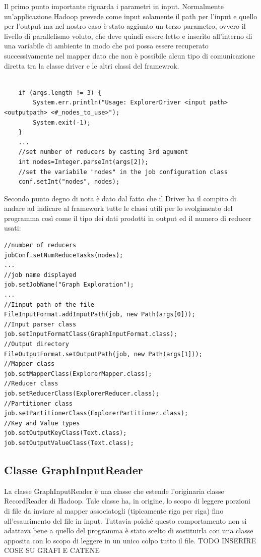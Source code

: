 \documentclass[]{IEEEtran}
\begin{document}
Il primo punto importante riguarda i parametri in input. Normalmente un'applicazione Hadoop prevede come input solamente il path per l'input e quello per l'output ma nel nostro caso è stato aggiunto un terzo parametro, ovvero il livello di parallelismo voluto, che deve quindi essere letto e inserito all'interno di una variabile di ambiente in modo che poi possa essere recuperato successivamente nel mapper dato che non è possibile alcun tipo di comunicazione diretta tra la classe driver e le altri classi del framewrok.
\begin{lstlisting}[style=javaStyle]

	if (args.length != 3) {
		System.err.println("Usage: ExplorerDriver <input path> <outputpath> <#_nodes_to_use>");
		System.exit(-1);
	}
	...
	//set number of reducers by casting 3rd agument
	int nodes=Integer.parseInt(args[2]);
	//set the variabile "nodes" in the job configuration class
	conf.setInt("nodes", nodes);
\end{lstlisting}

Secondo punto degno di nota è dato dal fatto che il Driver ha il compito di andare ad indicare al framework tutte le classi utili per lo svolgimento del programma così come il tipo dei dati prodotti in output ed il numero di reducer usati:
\begin{lstlisting}[style=javaStyle]
//number of reducers
jobConf.setNumReduceTasks(nodes); 
...
//job name displayed
job.setJobName("Graph Exploration"); 
...
//Iinput path of the file
FileInputFormat.addInputPath(job, new Path(args[0])); 
//Input parser class
job.setInputFormatClass(GraphInputFormat.class); 
//Output directory
FileOutputFormat.setOutputPath(job, new Path(args[1]));
//Mapper class
job.setMapperClass(ExplorerMapper.class);	
//Reducer class
job.setReducerClass(ExplorerReducer.class); 
//Partitioner class
job.setPartitionerClass(ExplorerPartitioner.class); 
//Key and Value types
job.setOutputKeyClass(Text.class); 
job.setOutputValueClass(Text.class);
\end{lstlisting}
\subsection{Classe GraphInputReader}
La classe GraphInputReader è una classe che estende l'originaria classe RecordReader di Hadoop. Tale classe ha, in origine, lo scopo di leggere porzioni di file da inviare al mapper associatogli (tipicamente riga per riga) fino all'esaurimento del file in input. Tuttavia poiché questo comportamento non si adattava bene a quello del programma è stato scelto di sostituirla con una classe apposita con lo scopo di leggere in un unico colpo tutto il file. TODO INSERIRE COSE SU GRAFI E CATENE
\end{document}
